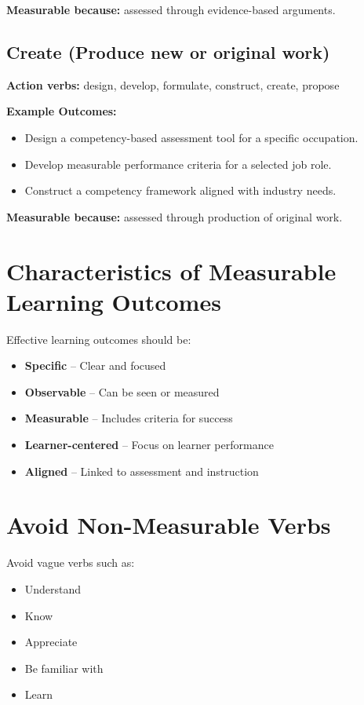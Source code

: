 \documentclass[12pt]{article}
\begin{document}
\textbf{Measurable because:} assessed through evidence-based arguments.

\subsection{Create (Produce new or original work)}

\textbf{Action verbs:} design, develop, formulate, construct, create, propose

\textbf{Example Outcomes:}

\begin{itemize}
    \item Design a competency-based assessment tool for a specific occupation.
    \item Develop measurable performance criteria for a selected job role.
    \item Construct a competency framework aligned with industry needs.
\end{itemize}

\textbf{Measurable because:} assessed through production of original work.

\section{Characteristics of Measurable Learning Outcomes}

Effective learning outcomes should be:

\begin{itemize}
    \item \textbf{Specific} -- Clear and focused
    \item \textbf{Observable} -- Can be seen or measured
    \item \textbf{Measurable} -- Includes criteria for success
    \item \textbf{Learner-centered} -- Focus on learner performance
    \item \textbf{Aligned} -- Linked to assessment and instruction
\end{itemize}

\section{Avoid Non-Measurable Verbs}

Avoid vague verbs such as:

\begin{itemize}
    \item Understand
    \item Know
    \item Appreciate
    \item Be familiar with
    \item Learn
\end{itemize}
\end{document}
